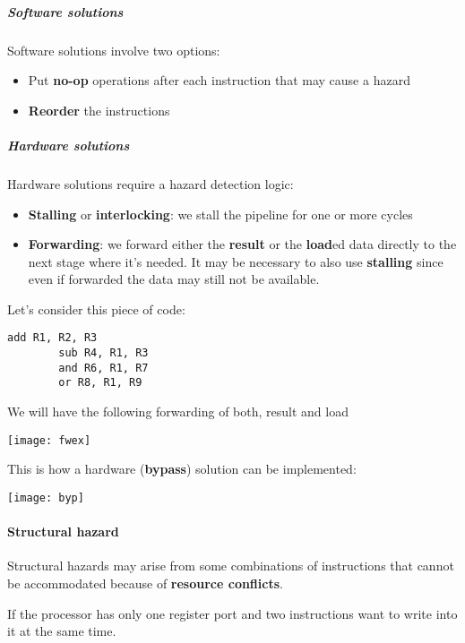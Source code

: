 \subparagraph{Software solutions}
Software solutions involve two options:
\begin{itemize}[leftmargin=+1.5cm]
	\item Put \textbf{no-op} operations after each instruction that may cause a hazard
	\item \textbf{Reorder} the instructions
\end{itemize}

\subparagraph{Hardware solutions}
Hardware solutions require a hazard detection logic:
\begin{itemize}[leftmargin=+1.5cm]
	\item \textbf{Stalling} or \textbf{interlocking}: we stall the pipeline for one or more cycles
	\item \textbf{Forwarding}: we forward either the \textbf{result} or the \textbf{load}ed data directly to the next stage where it's needed. It may be necessary to also use \textbf{stalling} since even if forwarded the data may still not be available.
\end{itemize}

\newpage
\begin{example}[Forwarding]
	Let's consider this piece of code:
	\begin{lstlisting}[language={[x86masm]Assembler}]
		add R1, R2, R3
		sub R4, R1, R3
		and R6, R1, R7
		or R8, R1, R9
	\end{lstlisting}
	We will have the following forwarding of both, result and load
	\begin{center}
		\texttt{[image: fwex]}
	\end{center}
\end{example}

This is how a hardware (\textbf{bypass}) solution can be implemented:
\begin{center}
	\texttt{[image: byp]}
\end{center}
\newpage

\paragraph{Structural hazard}
Structural hazards may arise from some combinations of instructions that cannot be accommodated because of \textbf{resource conflicts}.
\begin{example}
	If the processor has only one register port and two instructions want to write into it at the same time.
\end{example}

